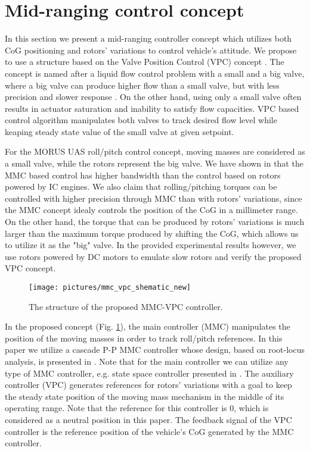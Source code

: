 \section{Mid-ranging control concept}
\label{sec:control}
In this section we present a mid-ranging controller concept which utilizes both CoG positioning and rotors' variations to control vehicle's attitude. We propose to use a structure based on the Valve Position Control (VPC) concept \cite{Allison2003MidRanging}. The concept is named after a liquid flow control problem with a small and a big valve, where a big valve can produce higher flow than a small valve, but with less precision and slower response \cite{Allison1997MidRanging}. On the other hand, using only a small valve often results in actuator saturation and inability to satisfy flow capacities. VPC based control algorithm manipulates both valves to track desired flow level while keaping steady state value of the small valve at given setpoint.

For the MORUS UAS roll/pitch control concept, moving masses are considered as a small valve, while the rotors represent the big valve. We have shown in \cite{Haus2017} that the MMC based control has higher bandwidth than the control based on rotors powered by IC engines. We also claim that rolling/pitching torques can be controlled with higher precision through MMC than with rotors' variations, since the MMC concept idealy controls the position of the CoG in a millimeter range. On the other hand, the torque that can be produced by rotors' variations is much larger than the maximum torque produced by shifting the CoG, which allows us to utilize it as the "big" valve. In the provided experimental results however, we use rotors powered by DC motors to emulate slow rotors and verify the proposed VPC concept. 
\begin{figure}[t!]
\centering
\texttt{[image: pictures/mmc\_vpc\_shematic\_new]}
\caption{The structure of the proposed MMC-VPC controller.}
\label{fig:mmc_vpc_structure}
\end{figure}

In the proposed concept (Fig. \ref{fig:mmc_vpc_structure}), the main controller (MMC) manipulates the position of the moving masses in order to track roll/pitch references. In this paper we utilize a cascade P-P MMC controller whose design, based on root-locus analysis, is presented in \cite{Haus2017}. Note that for the main controller we can utilize any type of MMC controller, e.g. state space controller presented in \cite{Morus2017Icuas}. The auxiliary controller (VPC) generates references for rotors' variations with a goal to keep the steady state position of the moving mass mechanism in the middle of its operating range. Note that the reference for this controller is 0, which is considered as a neutral position in this paper. The feedback signal of the VPC controller is the reference position of the vehicle's CoG  generated by the MMC controller. 

